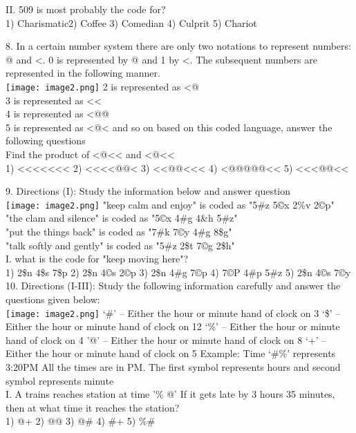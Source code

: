 \documentclass[
]{article}
\begin{document}
II. 509 is most probably the code for?\\
1) Charismatic2) Coffee 3) Comedian 4) Culprit 5) Chariot

8. In a certain number system there are only two notations to represent numbers: @ and <. 0 is
represented by @ and 1 by <. The subsequent numbers are represented in the following
manner.\\
\texttt{[image: image2.png]}
2 is represented as <@\\
3 is represented as <<\\
4 is represented as <@@\\
5 is represented as <@< and so on
based on this coded language, answer the following questions\\
Find the product of <@<< and <@<<\\
1) <<<<<<< 2) <<<<@@< 3) <<@@<<< 4) <@@@@@<< 5) <<<@@<<

9. Directions (I): Study the information below and answer question\\
\texttt{[image: image2.png]}
"keep calm and enjoy" is coded as "5\#z 5©x 2\%v 2©p"\\
"the clam and silence" is coded as "5©x 4\#g 4\&h 5\#z"\\
"put the things back" is coded as "7\#k 7©y 4\#g 8\$g"\\
"talk softly and gently" is coded as "5\#z 2\$t 7©g 2\$h"\\

I. what is the code for "keep moving here"?\\
1) 2\$n 4\$s 7\$p 2) 2\$n 4©s 2©p 3) 2\$n 4\#g 7©p
4) 7©P 4\#p 5\#z 5) 2\$n 4©s 7©y\\

10. Directions (I-III): Study the following information carefully and answer the questions given
below:\\
\texttt{[image: image2.png]}
‘\#’ – Either the hour or minute hand of clock on 3
‘\$’ – Either the hour or minute hand of clock on 12
‘\%’ – Either the hour or minute hand of clock on 4
'@' – Either the hour or minute hand of clock on 8
‘+’ – Either the hour or minute hand of clock on 5
Example: Time ‘\#\%’ represents 3:20PM All the times are in PM. The first symbol represents
hours and second symbol represents minute\\
I. A trains reaches station at time '\% @' If it gets late by 3 hours 35 minutes, then at what
time it reaches the station?\\
1) @+ 2) @@ 3) @\# 4) \#+ 5) \%\#
\end{document}
